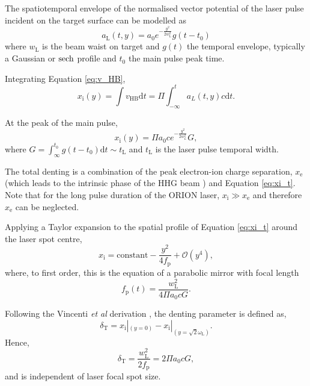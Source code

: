 The spatiotemporal envelope of the normalised vector potential of the laser pulse incident on the target surface can be modelled as
\begin{equation}
	a_\mathrm{L}(t,y) = a_0e^{-\frac{y^2}{2w_\mathrm{L}^2}}g(t-t_0)
\end{equation}
where $w_\mathrm{L}$ is the beam waist on target and $g(t)$ the temporal envelope, typically a Gaussian or $\operatorname{sech}$ profile and $t_0$ the main pulse peak time.

Integrating Equation \ref{eq:v_HB},
\begin{equation}\label{eq:xi_t}
	x_\mathrm{i}(y) = \int v_\mathrm{HB}\mathrm{d}t = \Pi \int^t_{-\infty} a_L(t,y)c\mathrm{d}t.
\end{equation}

At the peak of the main pulse,
\begin{equation}
	x_\mathrm{i}(y) = \Pi a_0ce^{-\frac{y^2}{2w_L^2}} G,
\end{equation}
where $G = \int_\infty^{t_0} g(t-t_0) \mathrm{d} t \sim t_\mathrm{L}$ and $t_\mathrm{L}$ is the laser pulse temporal width.

The total denting is a combination of the peak electron-ion charge separation, $x_\mathrm{e}$ (which leads to the intrinsic phase of the HHG beam \cite{derbruggePropagationRelativisticSurface2007}) and Equation \ref{eq:xi_t}. Note that for the long pulse duration of the ORION laser, $x_\mathrm{i} \gg x_\mathrm{e}$ and therefore $x_\mathrm{e}$ can be neglected.

Applying a Taylor expansion to the spatial profile of Equation \ref{eq:xi_t} around the laser spot centre,
\begin{equation}
	x_\mathrm{i} = \mathrm{constant} - \frac{y^2}{4f_\mathrm{p}} + \mathcal{O}(y^4),
\end{equation}
where, to first order, this is the equation of a parabolic mirror with focal length
\begin{equation}
	f_\mathrm{p}(t) = \frac{w_\mathrm{L}^2}{4\Pi a_0cG}.
\end{equation}

Following the Vincenti \textit{et al} derivation \cite{vincentiOpticalPropertiesRelativistic2014}, the denting parameter is defined as,
\begin{equation}
	\delta_\mathrm{T} =  x_\mathrm{i}|_{(y=0)} - x_\mathrm{i}|_{(y=\sqrt{2}\omega_\mathrm{L})}.
\end{equation}
Hence,
\begin{equation}
	\delta_\mathrm{T} = \frac{w_\mathrm{L}^2}{2f_\mathrm{p}} = 2\Pi a_0 c G,
\end{equation}
and is independent of laser focal spot size. 

